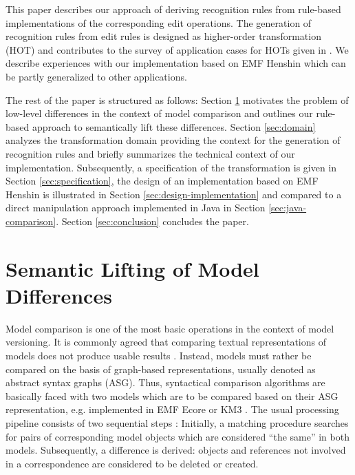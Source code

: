 \documentclass{llncs}
\begin{document}
This paper describes our approach of deriving recognition
rules from rule-based implementations of the corresponding
edit operations. The generation of recognition rules from edit
rules is designed as higher-order transformation (HOT) and
contributes to the survey of application cases for HOTs 
given in \cite{TiJFCB2009ECMDA}. We describe experiences
with our implementation based on EMF Henshin which can
be partly generalized to other applications. 

The rest of the paper is structured as follows:
Section \ref{sec:semantic-lifting} motivates the problem of 
low-level differences in the context of model comparison and
outlines our rule-based approach to semantically lift
these differences. Section \ref{sec:domain} analyzes the transformation 
domain providing the context for the generation of recognition
rules and briefly summarizes the technical context of
our implementation. Subsequently, a specification of the
transformation is given in Section \ref{sec:specification}, the design  
of an implementation based on EMF Henshin is illustrated
in Section \ref{sec:design-implementation} and compared
to a direct manipulation approach implemented in Java in 
Section \ref{sec:java-comparison}.
Section \ref{sec:conclusion} concludes the paper.








\section{Semantic Lifting of Model Differences}
\label{sec:semantic-lifting}
Model comparison is one of the most basic operations in the
context of model versioning.
It is commonly agreed that comparing textual representations of
models does not produce usable results \cite{BeE2009MBSE}.
Instead, models must rather be compared on the basis of graph-based
representations, usually denoted as abstract syntax graphs (ASG).
Thus, syntactical comparison algorithms are basically faced with two 
models which are to be compared based on their ASG representation,
e.g. implemented in EMF Ecore \cite{EMF} or KM3 \cite{KM3}.
The usual processing pipeline consists of two sequential
steps \cite{KoRPP2009CVSM}\cite{EMFC}: Initially, a matching procedure 
searches for pairs of corresponding model objects which are
considered ``the same'' in both models. Subsequently, a 
difference is derived: objects and references not involved in 
a correspondence are considered to be deleted or created.
\end{document}
